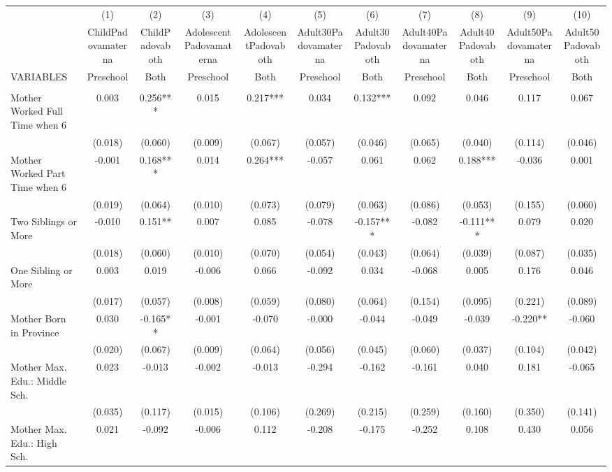 \begin{tabular}{lcccccccccc} \hline
 & (1) & (2) & (3) & (4) & (5) & (6) & (7) & (8) & (9) & (10) \\
 & ChildPadovamaterna & ChildPadovaboth & AdolescentPadovamaterna & AdolescentPadovaboth & Adult30Padovamaterna & Adult30Padovaboth & Adult40Padovamaterna & Adult40Padovaboth & Adult50Padovamaterna & Adult50Padovaboth \\
VARIABLES & Preschool & Both & Preschool & Both & Preschool & Both & Preschool & Both & Preschool & Both \\ \hline
 &  &  &  &  &  &  &  &  &  &  \\
Mother Worked Full Time when 6 & 0.003 & 0.256*** & 0.015 & 0.217*** & 0.034 & 0.132*** & 0.092 & 0.046 & 0.117 & 0.067 \\
 & (0.018) & (0.060) & (0.009) & (0.067) & (0.057) & (0.046) & (0.065) & (0.040) & (0.114) & (0.046) \\
Mother Worked Part Time when 6 & -0.001 & 0.168*** & 0.014 & 0.264*** & -0.057 & 0.061 & 0.062 & 0.188*** & -0.036 & 0.001 \\
 & (0.019) & (0.064) & (0.010) & (0.073) & (0.079) & (0.063) & (0.086) & (0.053) & (0.155) & (0.060) \\
Two Siblings or More & -0.010 & 0.151** & 0.007 & 0.085 & -0.078 & -0.157*** & -0.082 & -0.111*** & 0.079 & 0.020 \\
 & (0.018) & (0.060) & (0.010) & (0.070) & (0.054) & (0.043) & (0.064) & (0.039) & (0.087) & (0.035) \\
One Sibling or More & 0.003 & 0.019 & -0.006 & 0.066 & -0.092 & 0.034 & -0.068 & 0.005 & 0.176 & 0.046 \\
 & (0.017) & (0.057) & (0.008) & (0.059) & (0.080) & (0.064) & (0.154) & (0.095) & (0.221) & (0.089) \\
Mother Born in Province & 0.030 & -0.165** & -0.001 & -0.070 & -0.000 & -0.044 & -0.049 & -0.039 & -0.220** & -0.060 \\
 & (0.020) & (0.067) & (0.009) & (0.064) & (0.056) & (0.045) & (0.060) & (0.037) & (0.104) & (0.042) \\
Mother Max. Edu.: Middle Sch. & 0.023 & -0.013 & -0.002 & -0.013 & -0.294 & -0.162 & -0.161 & 0.040 & 0.181 & -0.065 \\
 & (0.035) & (0.117) & (0.015) & (0.106) & (0.269) & (0.215) & (0.259) & (0.160) & (0.350) & (0.141) \\
Mother Max. Edu.: High Sch. & 0.021 & -0.092 & -0.006 & 0.112 & -0.208 & -0.175 & -0.252 & 0.108 & 0.430 & 0.056 \\

\end{tabular}
